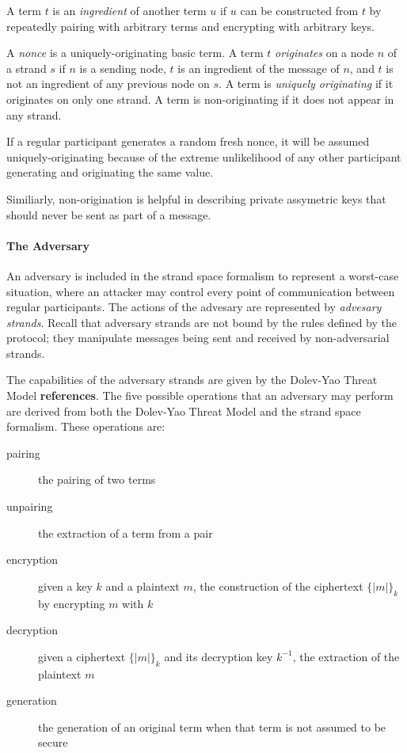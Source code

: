 				A term $t$ is an \emph{ingredient} of another term $u$ if $u$
				can be constructed from $t$ by repeatedly pairing with
				arbitrary terms and encrypting with arbitrary keys.

				A \emph{nonce} is a uniquely-originating basic term. A term $t$
				\emph{originates} on a node $n$ of a strand $s$ if $n$ is a
				sending node, $t$ is an ingredient of the message of $n$, and
				$t$ is not an ingredient of any previous node on $s$. A term is
				\emph{uniquely originating} if it originates on only one
				strand. A term is non-originating if it does not appear in any
				strand.

				If a regular participant generates a random fresh nonce, it
				will be assumed uniquely-originating because of the extreme
				unlikelihood of any other participant generating and
				originating the same value.

				Similiarly, non-origination is helpful in describing private
				assymetric keys that should never be sent as part of a message.

			\paragraph{The Adversary}

				An adversary is included in the strand space formalism to
				represent a worst-case situation, where an attacker may control
				every point of communication between regular participants.  The
				actions of the advesary are represented by \emph{advesary
				strands}. Recall that adversary strands are not bound by the
				rules defined by the protocol; they manipulate messages being
				sent and received by non-adversarial strands.

				The capabilities of the adversary strands are given by the
				Dolev-Yao Threat Model \textbf{references}. The five possible
				operations that an adversary may perform are derived from both
				the Dolev-Yao Threat Model and the strand space formalism.
				These operations are:

				\begin{description}
				\item [pairing] the pairing of two terms
				\item [unpairing] the extraction of a term from a pair
				\item [encryption] given a key $k$ and a plaintext $m$, the construction of the ciphertext $\{|m|\}_k$ by encrypting $m$ with $k$
				\item [decryption] given a ciphertext $\{|m|\}_k$ and its decryption key $k^{-1}$, the extraction of the plaintext $m$
				\item [generation] the generation of an original term when that term is not assumed to be secure
				\end{description}

